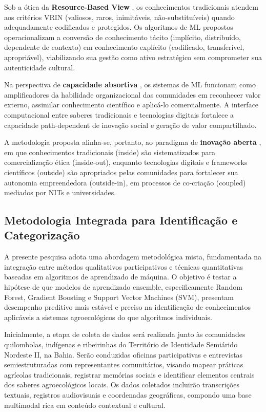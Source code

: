 Sob a ótica da \textbf{Resource-Based View} \cite{Barney1991}, os conhecimentos tradicionais atendem aos critérios VRIN (valiosos, raros, inimitáveis, não-substituíveis) quando adequadamente codificados e protegidos. Os algoritmos de ML propostos operacionalizam a conversão de conhecimento tácito (implícito, distribuído, dependente de contexto) em conhecimento explícito (codificado, transferível, apropriável), viabilizando sua gestão como ativo estratégico sem comprometer sua autenticidade cultural.

Na perspectiva de \textbf{capacidade absortiva} \cite{CohenLevinthal1990}, os sistemas de ML funcionam como amplificadores da habilidade organizacional das comunidades em reconhecer valor externo, assimilar conhecimento científico e aplicá-lo comercialmente. A interface computacional entre saberes tradicionais e tecnologias digitais fortalece a capacidade path-dependent de inovação social e geração de valor compartilhado.

A metodologia proposta alinha-se, portanto, ao paradigma de \textbf{inovação aberta} \cite{Chesbrough2003}, em que conhecimentos tradicionais (inside) são sistematizados para comercialização ética (inside-out), enquanto tecnologias digitais e frameworks científicos (outside) são apropriados pelas comunidades para fortalecer sua autonomia empreendedora (outside-in), em processos de co-criação (coupled) mediados por NITs e universidades.

\subsection{Metodologia Integrada para Identificação e Categorização}

A presente pesquisa adota uma abordagem metodológica mista, fundamentada na integração entre métodos qualitativos participativos e técnicas quantitativas baseadas em algoritmos de aprendizado de máquina. O objetivo é testar a hipótese de que modelos de aprendizado ensemble, especificamente Random Forest, Gradient Boosting e Support Vector Machines (SVM), presentam desempenho preditivo mais estável e preciso na identificação de conhecimentos aplicáveis a sistemas agroecológicos do que algoritmos individuais.

Inicialmente, a etapa de coleta de dados será realizada junto às comunidades quilombolas, indígenas e ribeirinhas do Território de Identidade Semiárido Nordeste II, na Bahia. Serão conduzidas oficinas participativas e entrevistas semiestruturadas com representantes comunitários, visando mapear práticas agrícolas tradicionais, registrar memórias sociais e identificar elementos centrais dos saberes agroecológicos locais. Os dados coletados incluirão transcrições textuais, registros audiovisuais e coordenadas geográficas, compondo uma base multimodal rica em conteúdo contextual e cultural.

